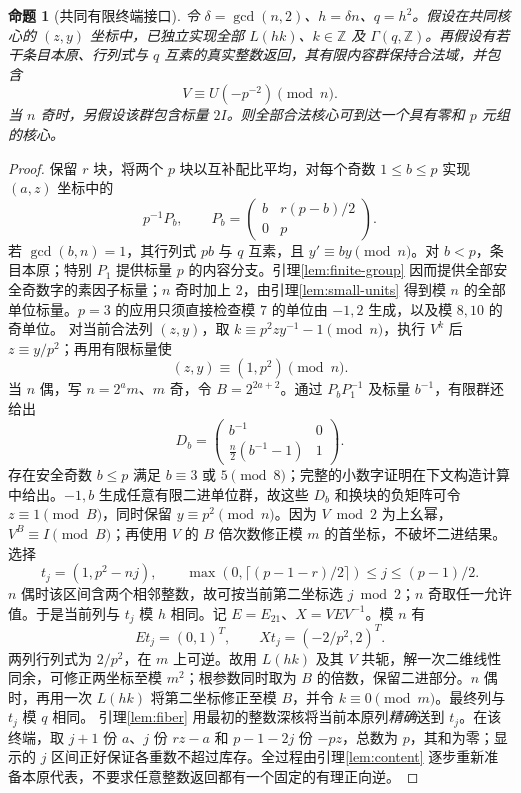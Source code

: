 \documentclass[11pt,a4paper]{article}
\newcommand{\ZZ}{\mathbb Z}
\newtheorem{proposition}[theorem]{命题}
\theoremstyle{definition}
\numberwithin{equation}{section}
\begin{document}
\begin{proposition}[共同有限终端接口]\label{prop:terminal}
令 $\delta=\gcd(n,2)$、$h=\delta n$、$q=h^2$。假设在共同核心的 $(z,y)$ 坐标中，已独立实现全部 $L(hk)$、$k\in\ZZ$ 及 $\Gamma(q,\ZZ)$。再假设有若干条目本原、行列式与 $q$ 互素的真实整数返回，其有限内容群保持合法域，并包含
\[V\equiv U(-p^{-2})\pmod n.\]
当 $n$ 奇时，另假设该群包含标量 $2I$。则全部合法核心可到达一个具有零和 $p$ 元组的核心。
\end{proposition}
\begin{proof}
保留 $r$ 块，将两个 $p$ 块以互补配比平均，对每个奇数 $1\le b\le p$ 实现 $(a,z)$ 坐标中的
\[p^{-1}P_b,\qquad P_b=\begin{pmatrix}b&r(p-b)/2\\0&p\end{pmatrix}.
\]
若 $\gcd(b,n)=1$，其行列式 $pb$ 与 $q$ 互素，且 $y'\equiv by\pmod n$。对 $b<p$，条目本原；特别 $P_1$ 提供标量 $p$ 的内容分支。引理\ref{lem:finite-group} 因而提供全部安全奇数字的素因子标量；$n$ 奇时加上 $2$，由引理\ref{lem:small-units} 得到模 $n$ 的全部单位标量。$p=3$ 的应用只须直接检查模 $7$ 的单位由 $-1,2$ 生成，以及模 $8,10$ 的奇单位。
对当前合法列 $(z,y)$，取 $k\equiv p^2zy^{-1}-1\pmod n$，执行 $V^k$ 后 $z\equiv y/p^2$；再用有限标量使
\[(z,y)\equiv(1,p^2)\pmod n.\]
当 $n$ 偶，写 $n=2^am$、$m$ 奇，令 $B=2^{2a+2}$。通过 $P_bP_1^{-1}$ 及标量 $b^{-1}$，有限群还给出
\[D_b=\begin{pmatrix}b^{-1}&0\\\frac n2(b^{-1}-1)&1\end{pmatrix}.
\]
存在安全奇数 $b\le p$ 满足 $b\equiv3$ 或 $5\pmod8$；完整的小数字证明在下文构造计算中给出。$-1,b$ 生成任意有限二进单位群，故这些 $D_b$ 和换块的负矩阵可令 $z\equiv1\pmod B$，同时保留 $y\equiv p^2\pmod n$。因为 $V\bmod2$ 为上幺幂，$V^B\equiv I\pmod B$；再使用 $V$ 的 $B$ 倍次数修正模 $m$ 的首坐标，不破坏二进结果。
选择
\[
 t_j=(1,p^2-nj),\qquad
 \max(0,\lceil(p-1-r)/2\rceil)\le j\le(p-1)/2.
\]
$n$ 偶时该区间含两个相邻整数，故可按当前第二坐标选 $j\bmod2$；$n$ 奇取任一允许值。于是当前列与 $t_j$ 模 $h$ 相同。记 $E=E_{21}$、$X=VEV^{-1}$。模 $n$ 有
\[Et_j=(0,1)^T,\qquad Xt_j=(-2/p^2,2)^T.\]
两列行列式为 $2/p^2$，在 $m$ 上可逆。故用 $L(hk)$ 及其 $V$ 共轭，解一次二维线性同余，可修正两坐标至模 $m^2$；根参数同时取为 $B$ 的倍数，保留二进部分。$n$ 偶时，再用一次 $L(hk)$ 将第二坐标修正至模 $B$，并令 $k\equiv0\pmod m$。最终列与 $t_j$ 模 $q$ 相同。
引理\ref{lem:fiber} 用最初的整数深核将当前本原列\emph{精确}送到 $t_j$。在该终端，取 $j+1$ 份 $a$、$j$ 份 $rz-a$ 和 $p-1-2j$ 份 $-pz$，总数为 $p$，其和为零；显示的 $j$ 区间正好保证各重数不超过库存。全过程由引理\ref{lem:content} 逐步重新准备本原代表，不要求任意整数返回都有一个固定的有理正向逆。
\end{proof}
\end{document}
